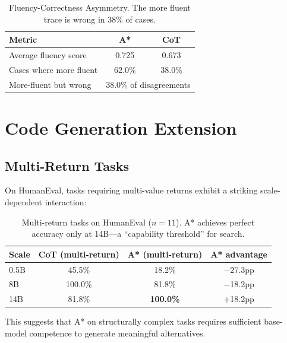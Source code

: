 \begin{table}[ht]
\centering
\small
\begin{tabular}{lcc}
\toprule
\textbf{Metric} & \textbf{A*} & \textbf{CoT} \\
\midrule
Average fluency score & 0.725 & 0.673 \\
Cases where more fluent & 62.0\% & 38.0\% \\
More-fluent but wrong & \multicolumn{2}{c}{38.0\% of disagreements} \\
\bottomrule
\end{tabular}
\caption{Fluency-Correctness Asymmetry. The more fluent trace is wrong in 38\% of cases.}
\label{tab:fluency_thesis}
\end{table}

\FloatBarrier
\section{Code Generation Extension}

\subsection{Multi-Return Tasks}

On HumanEval, tasks requiring multi-value returns exhibit a striking scale-dependent interaction:

\begin{table}[ht]
\centering
\small
\begin{tabular}{lccc}
\toprule
\textbf{Scale} & \textbf{CoT (multi-return)} & \textbf{A* (multi-return)} & \textbf{A* advantage} \\
\midrule
0.5B & 45.5\% & 18.2\% & $-$27.3pp \\
8B & 100.0\% & 81.8\% & $-$18.2pp \\
14B & 81.8\% & \textbf{100.0\%} & +18.2pp \\
\bottomrule
\end{tabular}
\caption{Multi-return tasks on HumanEval ($n=11$). A* achieves perfect accuracy only at 14B---a ``capability threshold'' for search.}
\label{tab:multi_return_thesis}
\end{table}

This suggests that A* on structurally complex tasks requires sufficient base-model competence to generate meaningful alternatives.

